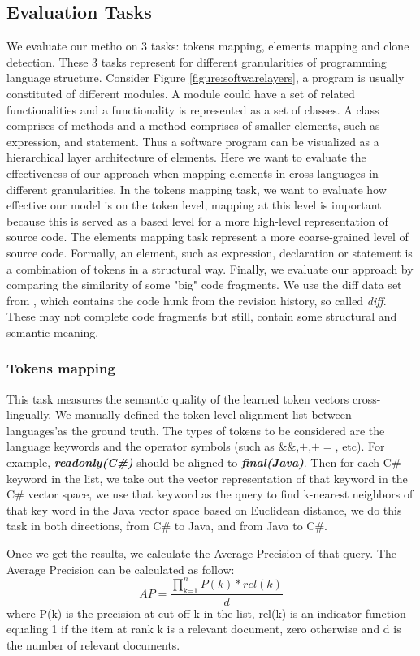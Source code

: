 \subsection{Evaluation Tasks}
We evaluate our metho on 3 tasks: tokens mapping, elements mapping and clone detection. These 3 tasks represent for different granularities of programming language structure. Consider Figure \ref{figure:softwarelayers}, a program is usually constituted of different modules. A module could have a set of related functionalities and a functionality is represented as a set of classes. A class comprises of methods and a method comprises of smaller elements, such as expression, and statement. Thus a software program can be visualized as a hierarchical layer architecture of elements. Here we want to evaluate the effectiveness of our approach when mapping elements in cross languages in different granularities. In the tokens mapping task, we want to evaluate how effective our model is on the token level, mapping at this level is important because this is served as a based level for a more high-level representation of source code. The elements mapping task represent a more coarse-grained level of source code. Formally, an element, such as expression, declaration or statement is a combination of tokens in a structural way. Finally, we evaluate our approach by comparing the similarity of some "big" code fragments. We use the diff data set from \cite{cheng2017clcminer}, which contains the code hunk from the revision history, so called \textit{diff}. These may not complete code fragments but still, contain some structural and semantic meaning.
\subsubsection{Tokens mapping}
This task measures the semantic quality of the learned token vectors cross-lingually.  We manually defined the token-level alignment list between languages'as the ground truth. The types of tokens to be considered are the language keywords and the operator symbols (such as \&\&,$+$,$+=$, etc). For example, \textbf{\textit{readonly(C\#)}} should be aligned to \textbf{\textit{final(Java)}}. Then for each C\# keyword in the list, we take out the vector representation of that keyword in the C\# vector space, we use that keyword as the query to find k-nearest neighbors of that key word in the Java vector space based on Euclidean distance, we do this task in both directions, from C\# to Java, and from Java to C\#. 

Once we get the results, we calculate the Average Precision of that query. 
The Average Precision can be calculated as follow:
\begin{displaymath}
AP = \frac{\prod_\text{k=1}^n P(k)*rel(k)}{d}
\end{displaymath}
where P(k) is the precision at cut-off k in the list, rel(k) is an indicator function equaling 1 if the item at rank k is a relevant document, zero otherwise and d is the number of relevant documents.

